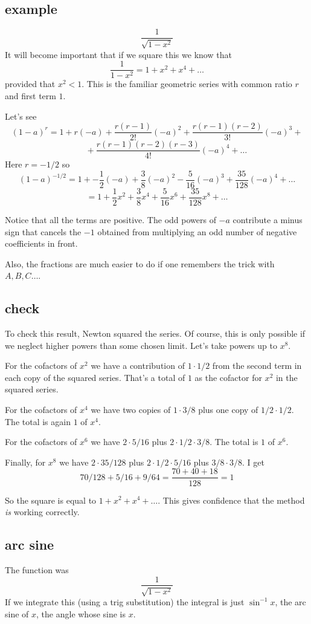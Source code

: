 \documentclass[11pt, oneside]{article}
\begin{document}
\subsection*{example}
\[ \frac{1}{\sqrt{1 - x^2}} \]
It will become important that if we square this we know that
\[ \frac{1}{1 - x^2} = 1 + x^2 + x^4 + \dots \]
provided that $x^2 < 1$.  This is the familiar geometric series with common ratio $r$ and first term $1$.

Let's see
\[ (1 - a)^{r} = 1 + r(-a) + \frac{r(r-1)}{2!} (-a)^2 + \frac{r(r-1)(r-2)}{3!} (-a)^3 + \]
\[ \ \ \ \ \ \ \ \ \ \ + \frac{r(r-1)(r-2)(r-3)}{4!} (-a)^4 + \dots \]
Here $r = -1/2$ so
\[ (1 - a)^{-1/2} = 1 + -\frac{1}{2}(-a) + \frac{3}{8} (-a)^2 - \frac{5}{16} (-a)^3 + \frac{35}{128} (-a)^4 + \dots \]
\[ = 1 + \frac{1}{2}x^2 + \frac{3}{8} x^4 + \frac{5}{16} x^6 + \frac{35}{128} x^8 + \dots \]

Notice that all the terms are positive.  The odd powers of $-a$ contribute a minus sign that cancels the $-1$ obtained from multiplying an odd number of negative coefficients in front.  

Also, the fractions are much easier to do if one remembers the trick with $A,B,C \dots$.

\subsection*{check}
To check this result, Newton squared the series.  Of course, this is only possible if we neglect higher powers than some chosen limit.  Let's take powers up to $x^8$.

For the cofactors of $x^2$ we have a contribution of $1 \cdot 1/2$ from the second term in each copy of the squared series.  That's a total of $1$ as the cofactor for $x^2$ in the squared series.

For the cofactors of $x^4$ we have two copies of $1 \cdot 3/8$ plus one copy of $1/2 \cdot 1/2$.  The total is again $1$ of $x^4$.

For the cofactors of $x^6$ we have $2 \cdot 5/16$ plus $2 \cdot 1/2 \cdot 3/8$.  The total is $1$ of $x^6$.

Finally, for $x^8$ we have $2 \cdot 35/128$ plus $2 \cdot 1/2 \cdot 5/16$ plus $3/8 \cdot 3/8$.  I get
\[ 70/128 + 5/16 + 9/64 = \frac{70 + 40 + 18}{128} = 1 \]

So the square is equal to $1 + x^2 + x^4 + \dots$.  This gives confidence that the method \emph{is} working correctly.

\subsection*{arc sine}
The function was
\[ \frac{1}{\sqrt{1 - x^2}} \]
If we integrate this (using a trig substitution) the integral is just $\sin^{-1}x$, the arc sine of $x$, the angle whose sine is $x$.
\end{document}
